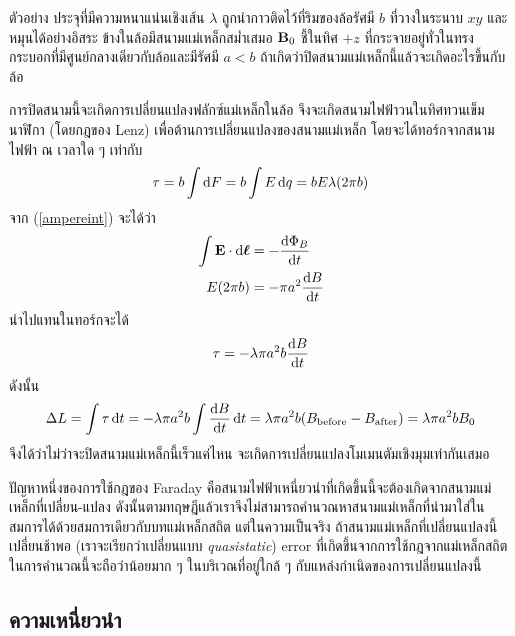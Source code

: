 \begin{corbox}{ตัวอย่าง}  
    ประจุที่มีความหนาแน่นเชิงเส้น $\lambda$ ถูกนำกาวติดไว้ที่ริมของล้อรัศมี $b$ ที่วางในระนาบ $xy$ และหมุนได้อย่างอิสระ ข้างในล้อมีสนามแม่เหล็กสม่ำเสมอ $\mathbf{B}_0$ ชี้ในทิศ $+z$ ที่กระจายอยู่ทั่วในทรงกระบอกที่มีศูนย์กลางเดียวกับล้อและมีรัศมี $a < b$ ถ้าเกิดว่าปิดสนามแม่เหล็กนี้แล้วจะเกิดอะไรขึ้นกับล้อ 
\end{corbox}
\begin{soln}
    การปิดสนามนี้จะเกิดการเปลี่ยนแปลงฟลักซ์แม่เหล็กในล้อ จึงจะเกิดสนามไฟฟ้าวนในทิศทวนเข็มนาฬิกา (โดยกฎของ Lenz) เพื่อต้านการเปลี่ยนแปลงของสนามแม่เหล็ก โดยจะได้ทอร์กจากสนามไฟฟ้า ณ เวลาใด ๆ เท่ากับ
    \[ 
    \tau = b\int \odif{F} = b\int E\odif{q} = bE\lambda(2\pi b) 
    \]
    จาก (\ref{ampereint}) จะได้ว่า
    \begin{align*} 
        \int \vb{E}\cdot\odif{\vbs{\ell}} &= -\odv{\Phi_B}{t}\\ 
        E(2\pi b) &= -\pi a^2 \odv{B}{t} 
    \end{align*}
    นำไปแทนในทอร์กจะได้
    \[ 
    \tau = -\lambda\pi a^2b \odv{B}{t} 
    \]
    ดังนั้น
    \[ 
    \Delta L = \int\tau\odif{t} = -\lambda\pi a^2b \int \odv{B}{t}\odif{t} = \lambda\pi a^2b(B_\txt{before} - B_\txt{after}) = \lambda\pi a^2b B_0 
    \]
    จึงได้ว่าไม่ว่าจะปิดสนามแม่เหล็กนี้เร็วแค่ไหน จะเกิดการเปลี่ยนแปลงโมเมนตัมเชิงมุมเท่ากันเสมอ
\end{soln}

ปัญหาหนึ่งของการใช้กฎของ Faraday คือสนามไฟฟ้าเหนี่ยวนำที่เกิดขึ้นนี้จะต้องเกิดจากสนามแม่เหล็กที่เปลี่ยน-แปลง ดังนั้นตามทฤษฎีแล้วเราจึงไม่สามารถคำนวณหาสนามแม่เหล็กที่นำมาใส่ในสมการได้ด้วยสมการเดียวกับบทแม่เหล็กสถิต แต่ในความเป็นจริง ถ้าสนามแม่เหล็กที่เปลี่ยนแปลงนี้เปลี่ยนช้าพอ (เราจะเรียกว่าเปลี่ยนแบบ \emph{quasistatic}) error ที่เกิดขึ้นจากการใช้กฎจากแม่เหล็กสถิตในการคำนวณนี้จะถือว่าน้อยมาก ๆ ในบริเวณที่อยู่ใกล้ ๆ กับแหล่งกำเนิดของการเปลี่ยนแปลงนี้

\subsection{ความเหนี่ยวนำ}

